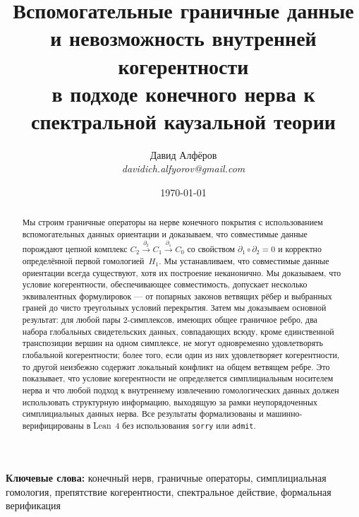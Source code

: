 \documentclass[11pt,a4paper]{article}
\theoremstyle{plain}
\theoremstyle{definition}
\theoremstyle{remark}
\begin{document}
\title{Вспомогательные граничные данные и невозможность внутренней когерентности\\
  в подходе конечного нерва к спектральной каузальной теории}

\author{Давид Алфёров\\[4pt]
  \small\textit{davidich.alfyorov@gmail.com}}

\date{\today}

\maketitle

\begin{abstract}
Мы строим граничные операторы на нерве конечного покрытия с использованием
вспомогательных данных ориентации и доказываем, что совместимые данные
порождают цепной комплекс $C_2 \xrightarrow{\partial_2} C_1 \xrightarrow{\partial_1} C_0$
со свойством $\partial_1 \circ \partial_2 = 0$ и корректно определённой
первой гомологией~$H_1$.
Мы устанавливаем, что совместимые данные ориентации всегда существуют,
хотя их построение неканонично. Мы доказываем, что условие когерентности,
обеспечивающее совместимость, допускает несколько эквивалентных формулировок ---
от попарных законов ветвящих рёбер и выбранных граней до чисто треугольных
условий перекрытия.
Затем мы доказываем основной результат: для любой пары 2-симплексов,
имеющих общее граничное ребро, два набора глобальных свидетельских данных,
совпадающих всюду, кроме единственной транспозиции вершин на одном симплексе,
не могут одновременно удовлетворять глобальной когерентности; более того,
если один из них удовлетворяет когерентности, то другой неизбежно содержит
локальный конфликт на общем ветвящем ребре. Это показывает, что условие
когерентности не определяется симплициальным носителем нерва и что любой
подход к внутреннему извлечению гомологических данных должен использовать
структурную информацию, выходящую за рамки неупорядоченных симплициальных
данных нерва. Все результаты формализованы и машинно-верифицированы
в Lean~4 без использования \texttt{sorry} или \texttt{admit}.
\end{abstract}

\medskip
\noindent\textbf{Ключевые слова:} конечный нерв, граничные операторы,
симплициальная гомология, препятствие когерентности, спектральное действие,
формальная верификация

\tableofcontents

\end{document}

